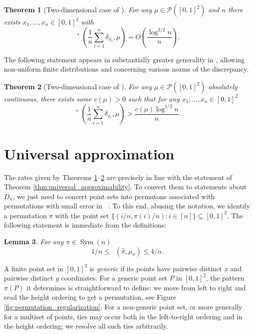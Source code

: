 \documentclass{article}
\newcommand{\Sym}{\mathop{\mathrm{Sym}}}
\newcommand{\ds}{\mathop{d_\square}}
\newtheorem{theorem}{Theorem}[section]
\newtheorem{lemma}[theorem]{Lemma}
\theoremstyle{definition}
\begin{document}
\begin{theorem}[{Two-dimensional case of \cite[Theorem~1]{Aistleitner2018}}]\label{thm:aistleitner}
    For any $\mu \in \mathcal{P}([0, 1]^2)$ and $n$ there exists $x_1, \dots, x_n\in[0, 1]^2$ with
    $${\ds}^*\left(\frac{1}{n}\sum_{i=1}^{n}\delta_{x_i}, \mu\right)= O\left(\frac{\log^{3/2}n}{n}\right).$$
\end{theorem}

The following statement appears in substantially greater generality in \cite{Chen1985}, allowing non-uniform finite distributions and concerning various norms of the discrepancy.

\begin{theorem}[{Two-dimensional case of \cite[Corollary~1]{Chen1985}}] \label{thm:chen}
    For any $\mu \in \mathcal{P}([0, 1]^2)$ absolutely continuous, there exists some $c(\mu)>0$ such that for any $x_1, \dots, x_n\in[0, 1]^2$
    $${\ds}^*\left(\frac{1}{n}\sum_{i=1}^{n}\delta_{x_i}, \mu\right)> \frac{c(\mu)\log^{1/2} n}{n}.$$
\end{theorem}

\section{Universal approximation} \label{sec:univ_approx}

The rates given by Theorems \ref{thm:aistleitner}--\ref{thm:chen} are precisely in line with the statement of Theorem \ref{thm:universal_approximability}. To convert them to statements about $D_n$, we just need to convert point sets into permutons associated with permutations with small error in $\ds$. To this end, abusing the notation, we identify a permutation $\pi$ with the point set $\{(i/n, \pi(i)/n): i\in [n]\}\subseteq [0, 1]^2$. The following statement is immediate from the definitions:

\begin{lemma} \label{lemma:step_permuton_permutation_point_measure_equivalence}
    For any $\pi\in \Sym(n)$
    $$1/n\leq \ds(\widehat\pi, \mu_{\pi})\leq 4/n.$$
\end{lemma}

A finite point set in $[0, 1]^2$ is \emph{generic} if its points have pairwise distinct $x$ and pairwise distinct $y$ coordinates. For a generic point set $P$ in $[0, 1]^2$, the pattern $\pi(P)$ it determines is straightforward to define: we move from left to right and read the height ordering to get a permutation, see Figure \ref{fig:permutation_regularization}. For a non-generic point set, or more generally for a multiset of points, ties may occur both in the left-to-right ordering and in the height ordering; we resolve all such ties arbitrarily.
\end{document}

